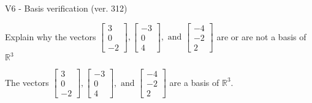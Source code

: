 \begin{exercise}
  \begin{exerciseTitle}V6 - Basis verification (ver. 312)\end{exerciseTitle}
  \begin{exerciseStatement}
    Explain why the vectors \(\left[\begin{array}{r}
3 \\
0 \\
-2
\end{array}\right] , \left[\begin{array}{r}
-3 \\
0 \\
4
\end{array}\right] , \text{ and } \left[\begin{array}{r}
-4 \\
-2 \\
2
\end{array}\right]\) are or are not a basis of \(\mathbb{R}^3\)	


  \end{exerciseStatement}
  \begin{exerciseAnswer}
   The vectors \(\left[\begin{array}{r}
3 \\
0 \\
-2
\end{array}\right] , \left[\begin{array}{r}
-3 \\
0 \\
4
\end{array}\right] , \text{ and } \left[\begin{array}{r}
-4 \\
-2 \\
2
\end{array}\right]\) 
  	 are  a basis of \(\mathbb{R}^3\).
  


  \end{exerciseAnswer}
\end{exercise}